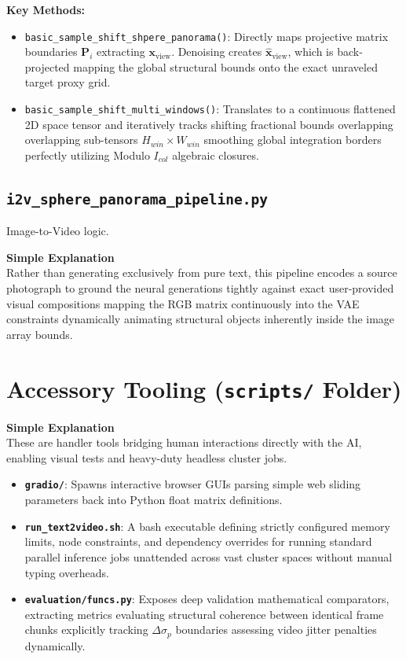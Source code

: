 \documentclass[11pt,a4paper]{article}
\begin{document}
\textbf{Key Methods:}
\begin{itemize}
    \item \texttt{basic\_sample\_shift\_shpere\_panorama()}: Directly maps projective matrix boundaries $\mathbf{P}_i$ extracting $\mathbf{x}_{\text{view}}$. Denoising creates $\hat{\mathbf{x}}_{\text{view}}$, which is back-projected mapping the global structural bounds onto the exact unraveled target proxy grid.
    \item \texttt{basic\_sample\_shift\_multi\_windows()}: Translates to a continuous flattened 2D space tensor and iteratively tracks shifting fractional bounds overlapping overlapping sub-tensors $H_{win} \times W_{win}$ smoothing global integration borders perfectly utilizing Modulo $I_{col}$ algebraic closures.
\end{itemize}

\subsection{\texttt{i2v\_sphere\_panorama\_pipeline.py}}
Image-to-Video logic.
\begin{simplebox}
\textbf{Simple Explanation} \\
Rather than generating exclusively from pure text, this pipeline encodes a source photograph to ground the neural generations tightly against exact user-provided visual compositions mapping the RGB matrix continuously into the VAE constraints dynamically animating structural objects inherently inside the image array bounds.
\end{simplebox}


\section{Accessory Tooling (\texttt{scripts/} Folder)}

\begin{simplebox}
\textbf{Simple Explanation} \\
These are handler tools bridging human interactions directly with the AI, enabling visual tests and heavy-duty headless cluster jobs.
\end{simplebox}

\begin{itemize}
    \item \textbf{\texttt{gradio/}}: Spawns interactive browser GUIs parsing simple web sliding parameters back into Python float matrix definitions.
    \item \textbf{\texttt{run\_text2video.sh}}: A bash executable defining strictly configured memory limits, node constraints, and dependency overrides for running standard parallel inference jobs unattended across vast cluster spaces without manual typing overheads.
    \item \textbf{\texttt{evaluation/funcs.py}}: Exposes deep validation mathematical comparators, extracting metrics evaluating structural coherence between identical frame chunks explicitly tracking $\Delta \sigma_p$ boundaries assessing video jitter penalties dynamically.
\end{itemize}
\end{document}
